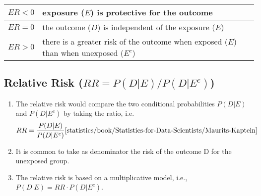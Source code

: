 \begin{customArrayStretch}{1.2}
    \begin{table}[H]
        \centering
        \begin{tabular}{|c|p{14cm}|}
            \hline
    
            $ER < 0$ & exposure ($E$) is protective for the outcome 
            \cite{statistics/book/Statistics-for-Data-Scientists/Maurits-Kaptein} \\
            \hline
            
            $ER = 0$ & the outcome ($D$) is independent of the exposure ($E$) 
            \cite{statistics/book/Statistics-for-Data-Scientists/Maurits-Kaptein} \\
            \hline
            
            $ER > 0$ & there is a greater risk of the outcome when exposed ($E$) than when unexposed ($E^c$) 
            \cite{statistics/book/Statistics-for-Data-Scientists/Maurits-Kaptein} \\
            \hline
        \end{tabular}
    \end{table}
\end{customArrayStretch}




\subsection{Relative Risk ($RR = {P(D|E)}/{P(D|E^c)}$)}

\begin{enumerate}
    \item The relative risk would compare the two conditional probabilities $P (D|E)$ and $P (D|E^c)$ by taking the ratio, i.e.
    \hfill \cite{statistics/book/Statistics-for-Data-Scientists/Maurits-Kaptein}
    \[
        RR = \dfrac{P(D|E)}{P(D|E^c)}
        \hfill \text{\cite{statistics/book/Statistics-for-Data-Scientists/Maurits-Kaptein}}
    \]

    \item It is common to take as denominator the risk of the outcome D for the unexposed group.
    \hfill \cite{statistics/book/Statistics-for-Data-Scientists/Maurits-Kaptein}

    \item The relative risk is based on a multiplicative model, i.e., $P (D|E) = RR \cdot P (D|E^c)$.
\end{enumerate}



